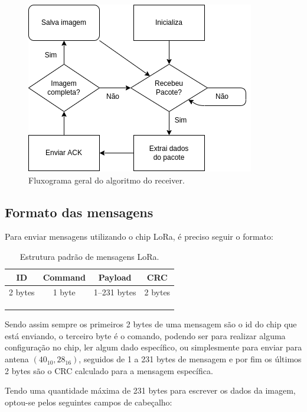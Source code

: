 \documentclass[
article,			%
12pt,				%
oneside,			%
a4paper,			%
english,			%
brazil,				%
sumario=tradicional
]{abntex2}
\begin{document}
\begin{figure}[h]
  \centering
  \includegraphics[width=.7\textwidth]{fluxogram_recivier}
  \caption{\label{fig:recivier}Fluxograma geral do algoritmo do receiver.}
\end{figure}

\cleardoublepage
\subsection{Formato das mensagens}\label{Formato das mensagens}
Para enviar mensagens utilizando o chip LoRa, é preciso seguir o formato:
\begin{table}[h]
\caption{Estrutura padrão de mensagens LoRa.}
\centering
\begin{tabular}{llll}
\hline
\multicolumn{1}{|c|}{ID}      & \multicolumn{1}{c|}{Command} & \multicolumn{1}{c|}{Payload}       & \multicolumn{1}{c|}{CRC}     \\ \hline
\multicolumn{1}{|c|}{2 bytes} & \multicolumn{1}{c|}{1 byte}  & \multicolumn{1}{c|}{1--231 bytes} & \multicolumn{1}{c|}{2 bytes} \\ \hline
 &  &  &  \\
 &  &  &  \\
 &  &  & 
\end{tabular}
\end{table}

Sendo assim sempre os primeiros 2 bytes de uma mensagem são o id do chip que está enviando, o terceiro byte é o comando, podendo ser para realizar alguma configuração no chip, ler algum dado específico, ou simplesmente para enviar para antena $(40_{10}, 28_{16})$, seguidos de 1 a 231 bytes de mensagem e por fim os últimos 2 bytes são o CRC calculado para a mensagem específica.

Tendo uma quantidade máxima de 231 bytes para escrever os dados da imagem, optou-se pelos seguintes campos de cabeçalho:
\end{document}
